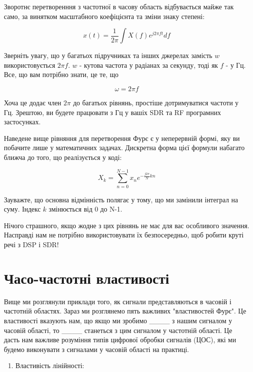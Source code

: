 Зворотнє перетворенння з частотної в часову область відбувається майже
так само, за винятком масштабного коефіцієнта та зміни знаку степені:

\[x(t) = \frac{1}{2 \pi} \int X(f) e^{j2\pi ft} df\]

Зверніть увагу, що у багатьох підручниках та інших джерелах замість
\(w\) використовується \(2\pi f\). \(w\) - кутова частота у радіанах за
секунду, тоді як \(f\) - у Гц. Все, що вам потрібно знати, це те, що

\[\omega = 2 \pi f\]

Хоча це додає член \(2 \pi\) до багатьох рівнянь, простіше дотримуватися
частоти у Гц. Зрештою, ви будете працювати з Гц у вашіх SDR та RF
програмних застосунках.

Наведене вище рівняння для перетворення Фур\textquotesingle є є у
неперервній формі, яку ви побачите лише у математичних задачах.
Дискретна форма цієї формули набагато ближча до того, що реалізується у
коді:

\[X_k = \sum_{n=0}^{N-1} x_n e^{-\frac{j2\pi}{N}kn}\]

Зауважте, що основна відмінність полягає у тому, що ми замінили інтеграл
на суму. Індекс \(k\) змінюється від 0 до N-1.

Нічого страшного, якщо жодне з цих рівнянь не має для вас особливого
значення. Насправді нам не потрібно використовувати їх безпосередньо,
щоб робити круті речі з DSP і SDR!

\section{Часо-частотні
властивості}\label{ux447ux430ux441ux43e-ux447ux430ux441ux442ux43eux442ux43dux456-ux432ux43bux430ux441ux442ux438ux432ux43eux441ux442ux456}

Вище ми розглянули приклади того, як сигнали представляються в часовій і
частотній областях. Зараз ми розглянемо п\textquotesingle ять важливих
"властивостей Фур\textquotesingle є". Це властивості вказують нам, що
якщо ми зробимо \_\_\_\_ з нашим сигналом у часовій області, то \_\_\_\_
станеться з цим сигналом у частотній області. Це дасть нам важливе
розуміння типів цифрової обробки сигналів (ЦОС), які ми будемо
виконувати з сигналами у часовій області на практиці.

\begin{enumerate}
\def\labelenumi{\arabic{enumi}.}
\tightlist
\item
  Властивість лінійності:
\end{enumerate}

